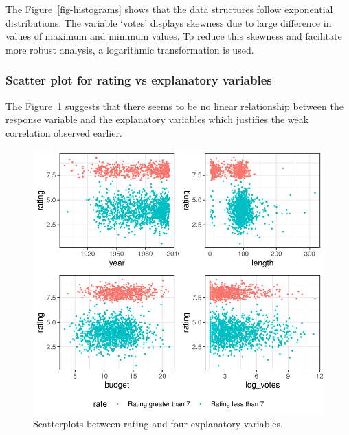 \documentclass[
  letterpaper,
  DIV=11,
  numbers=noendperiod]{scrartcl}
\begin{document}
The Figure~\ref{fig-histograms} shows that the data structures follow
exponential distributions. The variable `votes' displays skewness due to
large difference in values of maximum and minimum values. To reduce this
skewness and facilitate more robust analysis, a logarithmic
transformation is used.

\clearpage

\hypertarget{scatter-plot-for-rating-vs-explanatory-variables}{%
\subsubsection{Scatter plot for rating vs explanatory
variables}\label{scatter-plot-for-rating-vs-explanatory-variables}}

The Figure~\ref{fig-scatterplots-relationship} suggests that there seems
to be no linear relationship between the response variable and the
explanatory variables which justifies the weak correlation observed
earlier.

\begin{figure}

{\centering \includegraphics{Group_06_Analysis_files/figure-pdf/fig-scatterplots-relationship-1.pdf}

}

\caption{\label{fig-scatterplots-relationship}Scatterplots between
rating and four explanatory variables.}

\end{figure}
\end{document}
